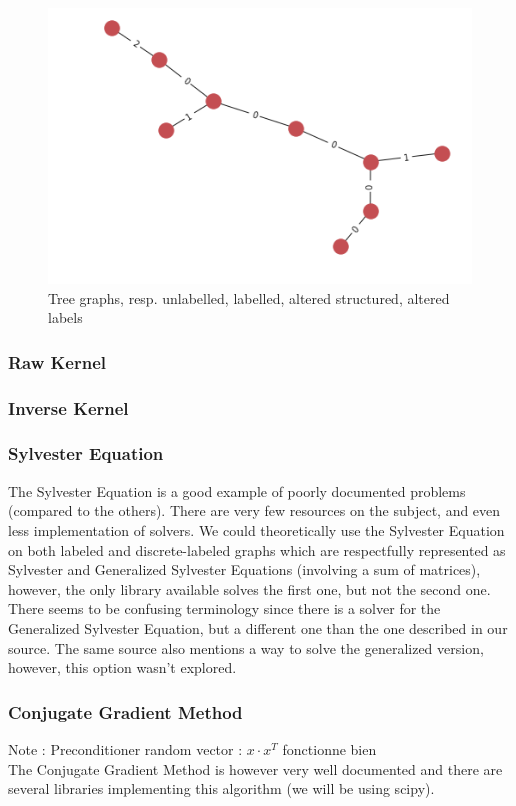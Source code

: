 \documentclass{article}
\theoremstyle{definition}
\begin{document}
\begin{figure}[!htb]
\begin{multicols}{4}
		\includegraphics[width=\linewidth]{data/generated-graphs/tree_altered_labels.png}\par
	\end{multicols}
	\caption{Tree graphs, resp. unlabelled, labelled, altered structured, altered labels}
\end{figure}
\subsubsection{Raw Kernel}
\subsubsection{Inverse Kernel}
\subsubsection{Sylvester Equation}
The Sylvester Equation is a good example of poorly documented problems (compared to the others). There are very few resources on the subject, and even less implementation of solvers. We could theoretically use the Sylvester Equation on both labeled and discrete-labeled graphs which are respectfully represented as Sylvester and Generalized Sylvester Equations (involving a sum of matrices), however, the only library available solves the first one, but not the second one. There seems to be confusing terminology since there is a solver for the Generalized Sylvester Equation, but a different one than the one described in our source\cite{vishwanathan_graph_2010}. The same source also mentions a way to solve the generalized version\cite{TODO}, however, this option wasn't explored.  
\subsubsection{Conjugate Gradient Method}
Note : Preconditioner random vector : $x \cdot x^{T}$ fonctionne bien\\
The Conjugate Gradient Method is however very well documented\cite{nesterov_lectures_2018} and there are several libraries implementing this algorithm (we will be using scipy).
\end{document}
